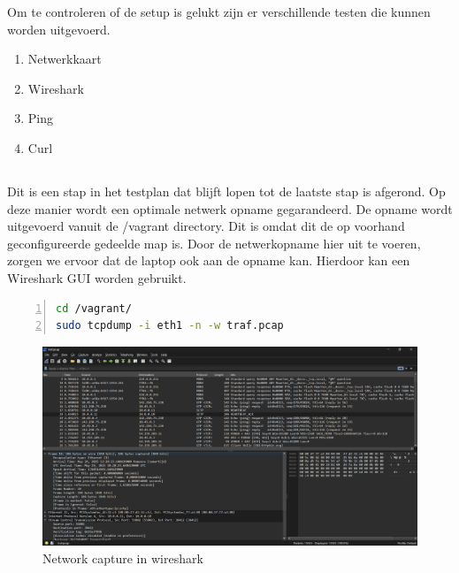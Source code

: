 Om te controleren of de setup is gelukt zijn er verschillende testen die kunnen worden uitgevoerd.

\begin{enumerate}
    \item Netwerkkaart
    \item Wireshark
    \item Ping
    \item Curl
\end{enumerate}

\subsection{}%
\label{sec:Test-NIC}%



\subsection{}%
\label{sec:Test-capture}%

Dit is een stap in het testplan dat blijft lopen tot de laatste stap is afgerond. Op deze manier wordt een optimale netwerk opname gegarandeerd. De opname wordt uitgevoerd vanuit de /vagrant directory. Dit is omdat dit de op voorhand geconfigureerde gedeelde map is. Door de netwerkopname hier uit te voeren, zorgen we ervoor dat de laptop ook aan de opname kan. Hierdoor kan een Wireshark GUI worden gebruikt.

\begin{lstlisting}[basicstyle=\small, frame=single, breaklines=true, postbreak=\mbox{\textcolor{red}{$\hookrightarrow$}\space}, escapeinside ={\%,}, escapechar={!}, numbers=left, language=sh, caption=Test - Tcpdump]
cd /vagrant/
sudo tcpdump -i eth1 -n -w traf.pcap
\end{lstlisting}

\begin{figure}[H]
    \includegraphics[width=\linewidth]{../graphics/POC-wireshark.png}
    \caption{Network capture in wireshark}
    \label{fig:wireshark}
\end{figure}

